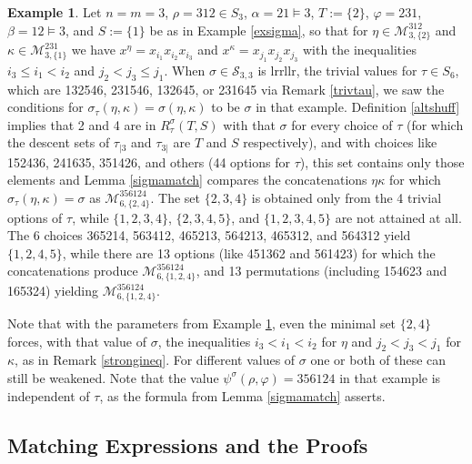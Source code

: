 \documentclass{article}
\theoremstyle{definition}
\newtheorem{ex}[thm]{Example}
\begin{document}
\begin{ex}
Let $n=m=3$, $\rho=312 \in S_{3}$, $\alpha=21\vDash3$, $T:=\{2\}$, $\varphi=231$, $\beta=12\vDash3$, and $S:=\{1\}$ be as in Example \ref{exsigma}, so that for $\eta\in\mathcal{M}_{3,\{2\}}^{312}$ and $\kappa\in\mathcal{M}_{3,\{1\}}^{231}$ we have $x^{\eta}=x_{i_{1}}x_{i_{2}}x_{i_{3}}$ and $x^{\kappa}=x_{j_{1}}x_{j_{2}}x_{j_{3}}$ with the inequalities $i_{3} \leq i_{1}<i_{2}$ and $j_{2}<j_{3} \leq j_{1}$. When $\sigma\in\mathcal{S}_{3,3}$ is lrrllr, the trivial values for $\tau \in S_{6}$, which are 132546, 231546, 132645, or 231645 via Remark \ref{trivtau}, we saw the conditions for $\sigma_{\tau}(\eta,\kappa)=\sigma(\eta,\kappa)$ to be $\sigma$ in that example. Definition \ref{altshuff} implies that 2 and 4 are in $R^{\sigma}_{\tau}(T,S)$ with that $\sigma$ for every choice of $\tau$ (for which the descent sets of $\tau_{|3}$ and $\tau_{3|}$ are $T$ and $S$ respectively), and with choices like 152436, 241635, 351426, and others (44 options for $\tau$), this set contains only those elements and Lemma \ref{sigmamatch} compares the concatenations $\eta\kappa$ for which $\sigma_{\tau}(\eta,\kappa)=\sigma$ as $\mathcal{M}_{6,\{2,4\}}^{356124}$. The set $\{2,3,4\}$ is obtained only from the 4 trivial options of $\tau$, while $\{1,2,3,4\}$, $\{2,3,4,5\}$, and $\{1,2,3,4,5\}$ are not attained at all. The 6 choices 365214, 563412, 465213, 564213, 465312, and 564312 yield $\{1,2,4,5\}$, while there are 13 options (like 451362 and 561423) for which the concatenations produce $\mathcal{M}_{6,\{1,2,4\}}^{356124}$, and 13 permutations (including 154623 and 165324) yielding $\mathcal{M}_{6,\{1,2,4\}}^{356124}$. \label{extausigma}
\end{ex}
Note that with the parameters from Example \ref{extausigma}, even the minimal set $\{2,4\}$ forces, with that value of $\sigma$, the inequalities $i_{3}<i_{1}<i_{2}$ for $\eta$ and $j_{2}<j_{3}<j_{1}$ for $\kappa$, as in Remark \ref{strongineq}. For different values of $\sigma$ one or both of these can still be weakened. Note that the value $\psi^{\sigma}(\rho,\varphi)=356124$ in that example is independent of $\tau$, as the formula from Lemma \ref{sigmamatch} asserts.

\subsection{Matching Expressions and the Proofs}
\end{document}
